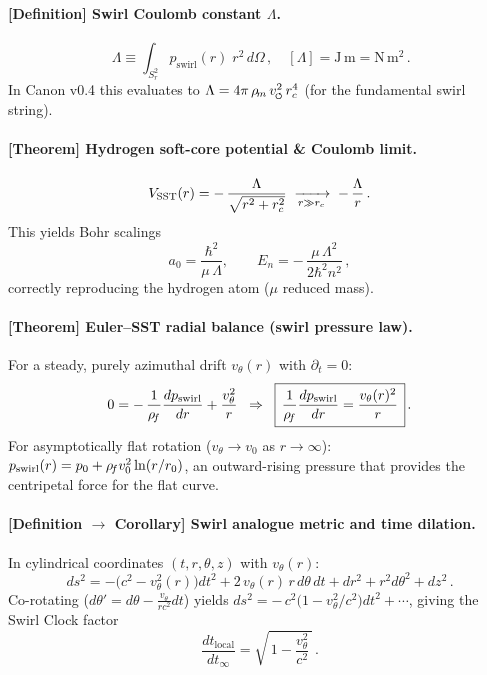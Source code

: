 \documentclass[11pt]{article}
\begin{document}
\paragraph{[Definition] Swirl Coulomb constant $\Lambda$.}
    \[
        \boxed{\,\Lambda \equiv \int_{S_r^2} p_{\text{swirl}}(r)\;r^2\,d\Omega\,}, \quad [\Lambda] = \mathrm{J\,m} = \mathrm{N\,m^2}\,.
    \]
    In Canon v0.4 this evaluates to $\Lambda = 4\pi\,\rhom\,\vscore^2\,\rc^4$ (for the fundamental swirl string).

\paragraph{[Theorem] Hydrogen soft-core potential \& Coulomb limit.}
    \[
        V_{\text{SST}}(r)=-\,\frac{\Lambda}{\sqrt{r^2+r_c^2}}
        \;\xrightarrow[r\gg r_c]{}\;
        -\,\frac{\Lambda}{r}\,.
    \]
    This yields Bohr scalings
    \[
        a_0=\frac{\hbar^2}{\mu\,\Lambda}, \qquad E_n=-\,\frac{\mu\,\Lambda^2}{2\hbar^2 n^2}\,,
    \]
    correctly reproducing the hydrogen atom ($\mu$ reduced mass).

\paragraph{[Theorem] Euler–SST radial balance (swirl pressure law).}
    For a steady, purely azimuthal drift $v_\theta(r)$ with $\partial_t=0$:
    \[
        0=-\,\frac{1}{\rho_{\!f}}\frac{dp_{\text{swirl}}}{dr}+\frac{v_\theta^2}{r}
        \;\;\Rightarrow\;\;
        \boxed{\,\frac{1}{\rho_{\!f}}\frac{dp_{\text{swirl}}}{dr}=\frac{v_\theta(r)^2}{r}\,}\,.
    \]
    For asymptotically flat rotation ($v_\theta\to v_0$ as $r\to\infty$): $p_{\text{swirl}}(r)=p_0+\rho_{\!f} v_0^2 \ln(r/r_0)$, an outward-rising pressure that provides the centripetal force for the flat curve.

\paragraph{[Definition $\to$ Corollary] Swirl analogue metric and time dilation.}
    In cylindrical coordinates $(t,r,\theta,z)$ with $v_\theta(r)$:
    \[
        ds^2 = -\big(c^2 - v_\theta^2(r)\big)dt^2 + 2\,v_\theta(r)\,r\,d\theta\,dt + dr^2 + r^2 d\theta^2 + dz^2\,.
    \]
    Co-rotating ($d\theta' = d\theta - \frac{v_\theta}{r c^2} dt$) yields $ds^2=-\,c^2\big(1 - v_\theta^2/c^2\big)dt^2+\cdots$, giving the Swirl Clock factor
    \[
        \frac{dt_{\text{local}}}{dt_{\infty}} = \sqrt{\,1-\frac{v_\theta^2}{c^2}\,}\,.
    \]
\end{document}
